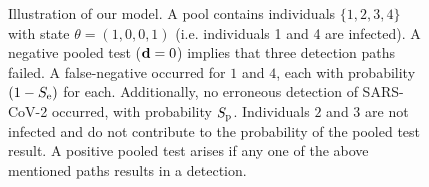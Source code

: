 \documentclass{article}
\begin{document}
\begin{figure}[H]
  \centering
  \caption{Illustration of our model. A pool contains individuals
    $\{1,2,3,4\}$ with state $\theta=(1,0,0,1)$ (i.e. individuals 1
    and 4 are infected). A negative pooled test ($\mathbf{d}=0$) implies
    that three detection paths failed. A false-negative occurred for
    $1$ and $4$, each with probability $(1-S_{\text{e}})$ for
    each. Additionally, no erroneous detection of SARS-CoV-2 occurred,
    with probability $S_{\text{p}}$. Individuals $2$ and $3$ are not infected
    and do not contribute to the probability of the pooled test
    result. A positive pooled test arises if any one of the above
    mentioned paths results in a detection.}\label{fig:likelihood}
\end{figure}
\end{document}
